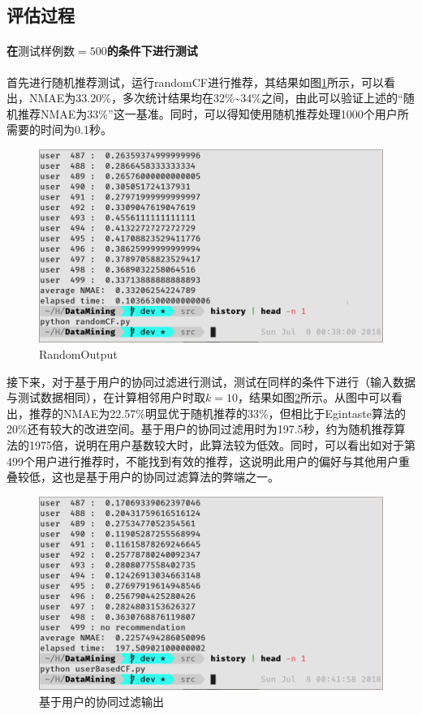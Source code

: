\documentclass{article}
\begin{document}
\subsection{评估过程}
\label{sub:ping_gu_guo_cheng_}
\paragraph{在\(测试样例数=500\)的条件下进行测试}
\par 首先进行随机推荐测试，运行randomCF进行推荐，其结果如图\ref{fig:randomOutput}所示，可以看出，NMAE为33.20\%，多次统计结果均在32\%\textasciitilde 34\%之间，由此可以验证上述的``随机推荐NMAE为33\%''这一基准。同时，可以得知使用随机推荐处理1000个用户所需要的时间为0.1秒。

\begin{figure}[htpb]
    \centering
    \includegraphics[width=0.9\linewidth]{randomOutput.png}
    \caption{RandomOutput}
    \label{fig:randomOutput}
\end{figure}

\par 接下来，对于基于用户的协同过滤进行测试，测试在同样的条件下进行（输入数据与测试数据相同），在计算相邻用户时取\(k=10\)，结果如图\ref{fig:userOutput1}所示。从图中可以看出，推荐的NMAE为22.57\%明显优于随机推荐的33\%，但相比于Egintaste算法的20\%还有较大的改进空间。基于用户的协同过滤用时为197.5秒，约为随机推荐算法的1975倍，说明在用户基数较大时，此算法较为低效。同时，可以看出如对于第499个用户进行推荐时，不能找到有效的推荐，这说明此用户的偏好与其他用户重叠较低，这也是基于用户的协同过滤算法的弊端之一。
\begin{figure}[htpb]
    \centering
    \includegraphics[width=0.9\linewidth]{userOutput1.png}
    \caption{基于用户的协同过滤输出}
    \label{fig:userOutput1}
\end{figure}
\end{document}

